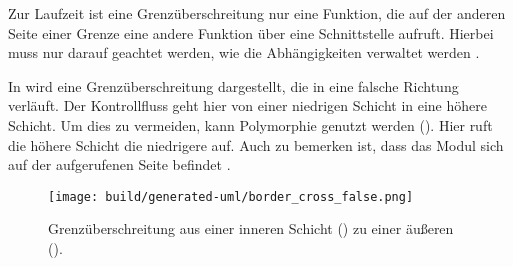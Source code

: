 



Zur Laufzeit ist eine Grenzüberschreitung nur eine Funktion, die auf der anderen Seite einer Grenze eine andere Funktion über eine Schnittstelle aufruft. Hierbei muss nur darauf geachtet werden, wie die Abhängigkeiten verwaltet werden \citep[vgl.][176]{martin2018}.


In  wird eine Grenzüberschreitung dargestellt, die in eine falsche Richtung verläuft. Der Kontrollfluss geht hier von einer niedrigen Schicht in eine höhere Schicht. Um dies zu vermeiden, kann Polymorphie genutzt werden (). Hier ruft die höhere Schicht die niedrigere auf. Auch zu bemerken ist, dass das Modul  sich auf der aufgerufenen Seite befindet \citep[vgl.][178]{martin2018}.


\begin{figure}
  \centering
  \texttt{[image: build/generated-uml/border\_cross\_false.png]}
   \caption{Grenzüberschreitung aus einer inneren Schicht () zu einer äußeren ().}
   \label{fig:border_cross_false}
\end{figure}

